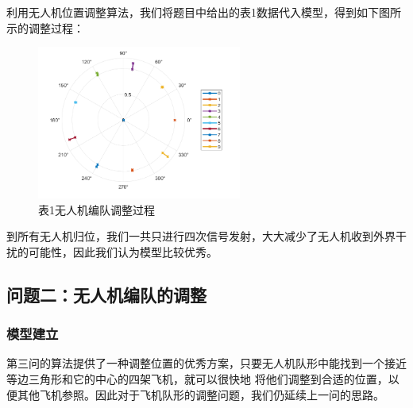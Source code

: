 \documentclass{my_paper}
\begin{document}
利用无人机位置调整算法，我们将题目中给出的表1数据代入模型，得到如下图所示的调整过程：

\begin{figure}[H]
    \centering
    \includegraphics[width=0.6\textwidth]{three}
    \caption{表1无人机编队调整过程} 
\end{figure}

到所有无人机归位，我们一共只进行四次信号发射，大大减少了无人机收到外界干扰的可能性，因此我们认为模型比较优秀。

\subsection{问题二：无人机编队的调整}

\subsubsection{模型建立}
第三问的算法提供了一种调整位置的优秀方案，只要无人机队形中能找到一个接近等边三角形和它的中心的四架飞机，就可以很快地
将他们调整到合适的位置，以便其他飞机参照。因此对于飞机队形的调整问题，我们仍延续上一问的思路。
\end{document}
